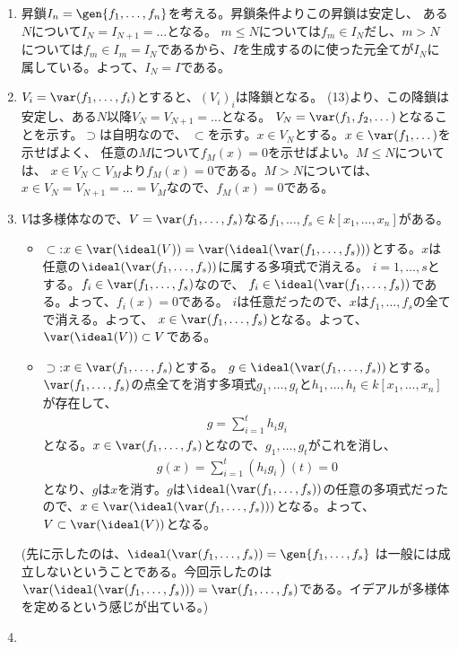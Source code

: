 \begin{enumerate}[label=(問題\arabic*)]
\item 昇鎖$I_n = \gen{f_1,\dots,f_n}$を考える。昇鎖条件よりこの昇鎖は安定し、
ある$N$について$I_N = I_{N+1} = \dots$となる。
$m \le N$については$f_m \in I_N$だし、$m> N$については$f_m \in I_m = I_N$であるから、$I$を生成するのに使った元全てが$I_N$に属している。よって、$I_N = I$である。
\item $V_i = \var(f_1,\dots,f_i)$とすると、$(V_i)_i$は降鎖となる。
(13)より、この降鎖は安定し、ある$N$以降$V_N = V_{N+1} = \dots$となる。
$V_N = \var(f_1,f_2,\dots)$となることを示す。$\supset$は自明なので、
$\subset$を示す。$x\in V_N$とする。$x \in \var(f_1,\dots)$を示せばよく、
任意の$M$について$f_M(x)=0$を示せばよい。$M\le N$については、
$x\in V_N \subset V_M$より$f_M(x)=0$である。$M > N$については、
$x \in V_N = V_{N+1} = \dots = V_M$なので、$f_M(x)=0$である。
\item
$V$は多様体なので、$V=\var(f_1,\dots,f_s)$なる$f_1,\dots,f_s \in k[x_1,\dots,x_n]$がある。
\begin{itemize}
  \item $\subset$:$x\in \var(\ideal(V)) = \var(\ideal(\var(f_1,\dots,f_s)))$とする。$x$は任意の$\ideal(\var(f_1,\dots,f_s))$に属する多項式で消える。
  $i=1,\dots,s$とする。$f_i \in \var(f_1,\dots,f_s)$なので、
  $f_i \in \ideal(\var(f_1,\dots,f_s))$である。よって、$f_i(x)=0$である。
  $i$は任意だったので、$x$は$f_1,\dots,f_s$の全てで消える。よって、
  $x\in \var(f_1,\dots,f_s)$となる。よって、$\var(\ideal(V)) \subset V$である。
  \item $\supset$:$x\in \var(f_1,\dots,f_s)$とする。
  $g\in \ideal(\var(f_1,\dots,f_s))$とする。$\var(f_1,\dots,f_s)$の点全てを消す多項式$g_1,\dots,g_t$と$h_1,\dots,h_t \in k[x_1,\dots,x_n]$が存在して、
  \begin{align}
    g = \sum_{i=1}^t h_i g_i
  \end{align}
  となる。$x\in \var(f_1,\dots,f_s)$となので、$g_1,\dots,g_t$がこれを消し、
  \begin{align}
    g(x) = \sum_{i=1}^t (h_i g_i)(t) = 0
  \end{align}
  となり、$g$は$x$を消す。$g$は$\ideal(\var(f_1,\dots,f_s))$の任意の多項式だったので、$x\in \var(\ideal(\var(f_1,\dots,f_s)))$となる。よって、
  $V\subset \var(\ideal(V))$となる。
  \end{itemize}
  (先に示したのは、$\ideal(\var(f_1,\dots,f_s)) = \gen{f_1,\dots,f_s}$
  は一般には成立しないということである。今回示したのは$\var(\ideal(\var(f_1,\dots,f_s)))=\var(f_1,\dots,f_s)$である。イデアルが多様体を定めるという感じが出ている。)
  \item

\end{enumerate}
